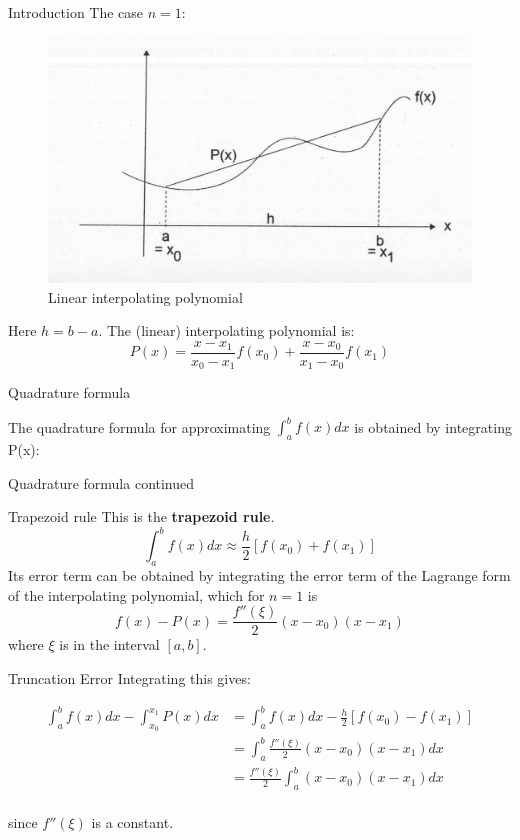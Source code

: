 \documentclass[12pt]{beamer}
\begin{document}
\begin{frame}{Introduction} 
The case $n=1$: 

\begin{figure} 
  \centering
  \includegraphics[scale=0.6]{linear_interpolating}
  \caption{Linear interpolating polynomial}
  \label{fig:linear}
\end{figure}
\noindent 
Here $h = b -a$. The (linear) interpolating polynomial is: 
\[
P(x) = \frac{x-x_1}{x_0-x_1}f(x_0) + \frac{x-x_0}{x_1-x_0} f(x_1) 
\]
\end{frame} 

\begin{frame}{Quadrature formula} 

The quadrature formula for approximating $\int_a^{b} f(x)dx$ is
obtained by integrating P(x):

\vspace{3 in}

\end{frame}

\begin{frame}{Quadrature formula continued} 


\end{frame}

\begin{frame}{Trapezoid rule}
This is the {\bf trapezoid rule}.
\[
\int_{a}^{b} f(x)dx \approx \frac{h}{2}[f(x_0)+f(x_1)]
\]
 Its error term can be obtained by
integrating the error term of the Lagrange form of the interpolating
polynomial, which for $n=1$ is
\[
f(x) - P(x) = \frac{f''(\xi)}{2}(x-x_0)(x-x_1) 
\]
\noindent 
where $\xi$ is in the interval $[a,b]$.
\end{frame}

\begin{frame}{Truncation Error} 
Integrating this gives: 

\begin{align*} 
\int_a^{b} f(x) dx - \int_{x_0}^{x_1} P(x)dx &= \int_a^{b} f(x) dx - \frac{h}{2} [ f(x_0) - f(x_1)] \\
&= \int_{a}^{b} \frac{f''(\xi)}{2}(x-x_0)(x-x_1)dx  \\
&= \frac{f''(\xi)}{2} \int_{a}^{b} (x-x_0)(x-x_1)dx \\ 
\end{align*} 

\noindent
since $f''(\xi)$ is a constant.

\end{frame} 
\end{document}
